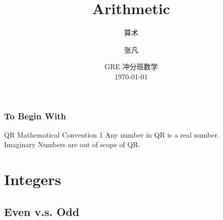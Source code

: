 \documentclass[
	11pt, %
	handout,
]{beamer}
\title[Arithmetic]{Arithmetic} %
\subtitle{算术} %
\author[张凡]{张凡} %
\institute[XDF]{新东方国际教育 \\ \smallskip \textit{zhangfan@xdf.cn}} %
\date[\today]{GRE 冲分班数学 \\ \today} %
\begin{document}

\begin{frame}
	\titlepage %
\end{frame}




\begin{frame}
	\frametitle{To Begin With}
	\begin{block}{QR Mathematical Convention 1 }
		Any number in QR is a real number. \\ Imaginary Numbers are \alert{out of scope of} QR.
	\end{block}
\end{frame}



\section{Integers}

\subsection{Even v.s. Odd}
\end{document}
